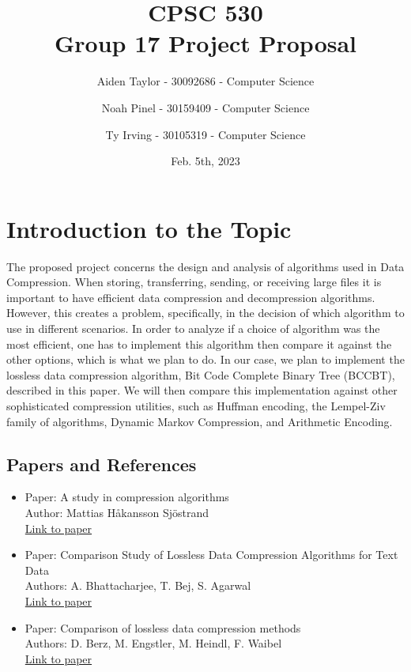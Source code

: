 \documentclass[11pt]{article}
\title{CPSC 530 \\ \Large Group 17 Project Proposal}
\author{
Aiden Taylor - 30092686 - Computer Science
\and
Noah Pinel - 30159409 - Computer Science
\and
Ty Irving - 30105319 - Computer Science
}
\date{Feb. 5th, 2023}
\begin{document}
\maketitle
\newpage

\section*{Introduction to the Topic}
The proposed project concerns the design and analysis of algorithms used in Data Compression.
When storing, transferring, sending, or receiving large files it is important to have efficient data compression and decompression algorithms.
However, this creates a problem, specifically, in the decision of which algorithm to use in different scenarios.
In order to analyze if a choice of algorithm was the most efficient, one has to implement this algorithm then compare it against the other options,
which is what we plan to do.
In our case, we plan to implement
the lossless data compression algorithm, Bit Code Complete Binary Tree (BCCBT), described in this paper. 
We will then compare this implementation against other sophisticated compression utilities,
such as Huffman encoding, the Lempel-Ziv family of algorithms, Dynamic Markov Compression, and Arithmetic Encoding.

\subsection*{Papers and References}
\begin{itemize}
  \item Paper: A study in compression algorithms\\
        Author: Mattias Håkansson Sjöstrand\\ 
        \href{http://bth.diva-portal.org/smash/record.jsf?faces-redirect=true&aq2=%5B%5B%5D%5D&af=%5B%5D&searchType=SIMPLE&language=en&pid=diva2%3A830266&aq=%5B%5B%5D%5D&sf=all&aqe=%5B%5D&sortOrder=author_sort_asc&onlyFullText=false&noOfRows=50&dswid=482}{Link to paper}
  
  \item Paper: Comparison Study of Lossless Data Compression Algorithms for Text Data \\
        Authors: A. Bhattacharjee, T. Bej, S. Agarwal\\ 
        \href{https://www.semanticscholar.org/paper/Comparison-Study-of-Lossless-Data-Compression-for-Bhattacharjee-Bej/ac777e46e7473c9e20ae94cceb58dcd4c058ce01}{Link to paper}
  
  \item Paper: Comparison of lossless data compression methods \\
        Authors: D. Berz, M. Engstler, M. Heindl, F. Waibel\\
        \href{https://www.researchgate.net/publication/335572104_Comparison_of_lossless_data_compression_methods}{Link to paper}

\end{itemize}
\end{document}
